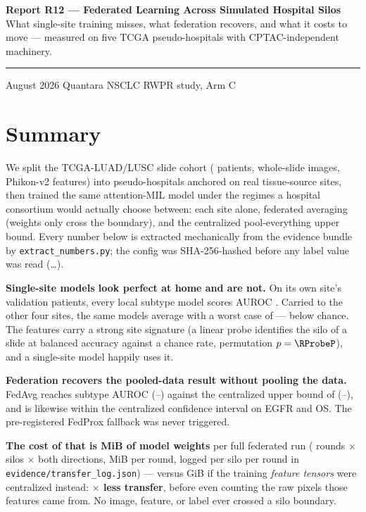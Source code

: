 \documentclass[11pt,a4paper]{article}
\begin{document}
\thispagestyle{empty}
\noindent
{\large\bfseries\color{qnavy} Report R12 --- Federated Learning Across Simulated Hospital Silos}\\[2pt]
{\color{qgrey}What single-site training misses, what federation recovers, and what it costs to move
--- measured on five TCGA pseudo-hospitals with CPTAC-independent machinery.}\\[6pt]
{\color{qgrey}\rule{\textwidth}{0.4pt}}

\medskip
{} August 2026 \quad\textbullet\quad Quantara \quad\textbullet\quad
NSCLC RWPR study, Arm C

\section*{Summary}

We split the TCGA-LUAD/LUSC slide cohort (\RPatientsKept{} patients, \RSlidesKept{} whole-slide
images, Phikon-v2 features) into \RNSilos{} pseudo-hospitals anchored on real tissue-source
sites, then trained the same attention-MIL model under the regimes a hospital consortium would
actually choose between: each site alone, federated averaging (weights only cross the boundary),
and the centralized pool-everything upper bound. Every number below is extracted mechanically
from the evidence bundle by \texttt{extract\_numbers.py}; the config was SHA-256-hashed before
any label value was read (\texttt{\RConfigShaShort}\ldots).

\textbf{Single-site models look perfect at home and are not.} On its own site's validation
patients, every local subtype model scores AUROC \RSubtypeDiagMean. Carried to the other four
sites, the same models average \textbf{\RSubtypeOffdiagMean} with a worst case of
\textbf{\RSubtypeOffdiagWorst} --- below chance. The features carry a strong site signature (a
linear probe identifies the silo of a slide at balanced accuracy \RProbeBalAcc{} against a
\RProbeChance{} chance rate, permutation $p=\RProbeP$), and a single-site model happily uses it.

\textbf{Federation recovers the pooled-data result without pooling the data.} FedAvg reaches
subtype AUROC \textbf{\RSubtypeFedavgMean} (\RSubtypeFedavgLo--\RSubtypeFedavgHi) against the
centralized upper bound of \RSubtypeCentralMean{} (\RSubtypeCentralLo--\RSubtypeCentralHi), and
is likewise within the centralized confidence interval on EGFR and OS. The pre-registered
FedProx fallback was never triggered.

\textbf{The cost of that is \RRunTotalMiB{} MiB of model weights} per full federated run
(\RRounds{} rounds $\times$ \RNSilos{} silos $\times$ both directions, \RRoundMiB{} MiB per
round, logged per silo per round in \texttt{evidence/transfer\_log.json}) --- versus
\RRawGiB{} GiB if the training \emph{feature tensors} were centralized instead:
\textbf{\RRawOverFed$\times$ less transfer}, before even counting the raw pixels those features
came from. No image, feature, or label ever crossed a silo boundary.
\end{document}
